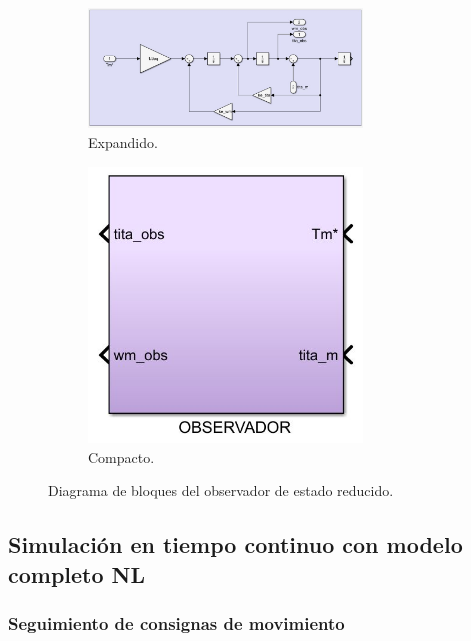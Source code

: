 \documentclass{article}
\begin{document}
\begin{figure}[H]
    \begin{subfigure}[b]{0.75\textwidth}
        \centering
        \includegraphics[width=0.8\textwidth]{observador_reducido.jpg}
        \caption{Expandido.}
    \end{subfigure}
    \begin{subfigure}[b]{0.24\textwidth}
        \centering
        \includegraphics[width=0.8\textwidth]{observador_reducido_compacto.jpg}
        \caption{Compacto.}
    \end{subfigure}
    \caption{Diagrama de bloques del observador de estado reducido.}
\end{figure}


\subsection{Simulación en tiempo continuo con modelo completo NL}

\subsubsection{Seguimiento de consignas de movimiento}
\end{document}

